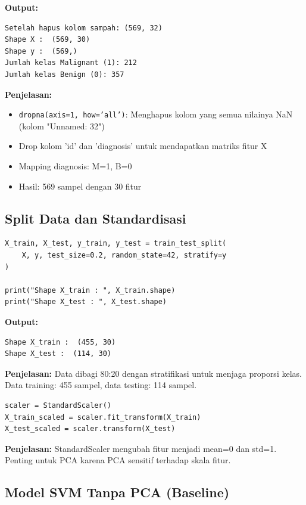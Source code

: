 \documentclass[12pt,a4paper]{article}
\begin{document}
\textbf{Output:}
\begin{verbatim}
Setelah hapus kolom sampah: (569, 32)
Shape X :  (569, 30)
Shape y :  (569,)
Jumlah kelas Malignant (1): 212
Jumlah kelas Benign (0): 357
\end{verbatim}

\textbf{Penjelasan:} 
\begin{itemize}
    \item \texttt{dropna(axis=1, how='all')}: Menghapus kolom yang semua nilainya NaN (kolom "Unnamed: 32")
    \item Drop kolom 'id' dan 'diagnosis' untuk mendapatkan matriks fitur X
    \item Mapping diagnosis: M=1, B=0
    \item Hasil: 569 sampel dengan 30 fitur
\end{itemize}

\subsection{Split Data dan Standardisasi}

\begin{lstlisting}[caption=Train-Test Split]
X_train, X_test, y_train, y_test = train_test_split(
    X, y, test_size=0.2, random_state=42, stratify=y
)

print("Shape X_train : ", X_train.shape)
print("Shape X_test : ", X_test.shape)
\end{lstlisting}

\textbf{Output:}
\begin{verbatim}
Shape X_train :  (455, 30)
Shape X_test :  (114, 30)
\end{verbatim}

\textbf{Penjelasan:} Data dibagi 80:20 dengan stratifikasi untuk menjaga proporsi kelas. Data training: 455 sampel, data testing: 114 sampel.

\begin{lstlisting}[caption=Standardisasi Fitur]
scaler = StandardScaler()
X_train_scaled = scaler.fit_transform(X_train)
X_test_scaled = scaler.transform(X_test)
\end{lstlisting}

\textbf{Penjelasan:} StandardScaler mengubah fitur menjadi mean=0 dan std=1. Penting untuk PCA karena PCA sensitif terhadap skala fitur.

\subsection{Model SVM Tanpa PCA (Baseline)}
\end{document}
